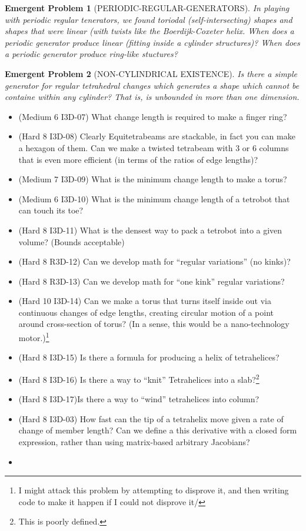 \documentclass[11pt]{article}
\newtheorem{eproblem}{Emergent Problem}
\begin{document}
\begin{eproblem}[PERIODIC-REGULAR-GENERATORS]
  In playing with periodic regular tenerators, we found toriodal (self-intersecting) shapes and shapes that were linear (with twists like the Boerdijk-Coxeter helix.
  When does a periodic generator produce linear (fitting inside a cylinder structures)?
  When does a periodic generator produce ring-like stuctures?
\end{eproblem}

\begin{eproblem}[NON-CYLINDRICAL EXISTENCE]
  Is there a simple generator for regular tetrahedral changes which generates a shape which cannot be containe within any cylinder?  That is, is unbounded in more than one dimension.
\end{eproblem}


\begin{itemize}
\item (Medium 6 I3D-07) What change length is required to make a finger ring?
\item (Hard 8 I3D-08) Clearly Equitetrabeams are stackable, in fact you can make a hexagon of them. Can we make a twisted tetrabeam with 3 or 6 columns that is even more efficient (in terms of the ratios of edge lengths)?
\item (Medium 7 I3D-09) What is the minimum change length to make a torus?
\item (Medium 6 I3D-10) What is the minimum change length of a tetrobot that can touch its toe?
\item (Hard 8 I3D-11) What is the densest way to pack a tetrobot into a given volume? (Bounds acceptable)
\item (Hard 8 R3D-12) Can we develop math for ``regular variations'' (no kinks)?
\item (Hard 8 R3D-13) Can we develop math for ``one kink'' regular variations?
\item (Hard 10 I3D-14) Can we make a torus that turns itself inside out via continuous changes of edge lengths,
  creating circular motion of a point around cross-section of torus? (In a sense, this would be a nano-technology motor.)\footnote{I might attack this problem by attempting to disprove it, and then writing code to make it happen if I could not disprove it/}
\item (Hard 8 I3D-15) Is there a formula for producing a helix of tetrahelices?
\item (Hard 8 I3D-16) Is there a way to ``knit'' Tetrahelices into  a slab?\footnote{This is poorly defined.}
\item (Hard 8 I3D-17)Is there a way to ``wind'' tetrahelices into column?
\item (Hard 8 I3D-03) How fast can the tip of a tetrahelix move given a rate of change of member length? Can we define a this derivative with a closed form expression, rather than using matrix-based arbitrary Jacobians?
\item 
\end{itemize}
\end{document}
